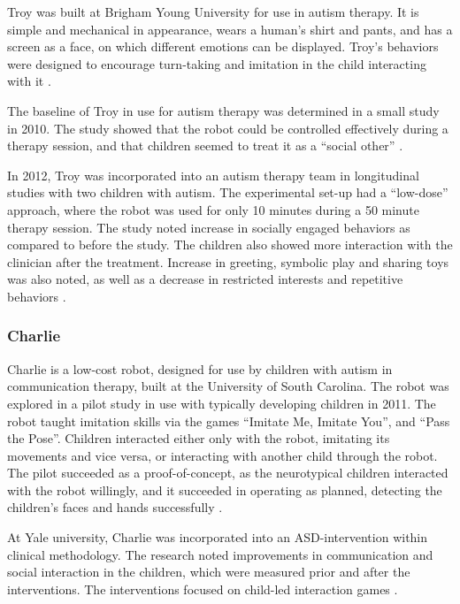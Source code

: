 Troy was built at Brigham Young University for use in autism therapy. It is simple and mechanical in appearance, wears a human's shirt and pants, and has a screen as a face, on which different emotions can be displayed. Troy's behaviors were designed to encourage turn-taking and imitation in the child interacting with it \cite{goodrich2011case}.

The baseline of Troy in use for autism therapy was determined in a small study in 2010. The study showed that the robot could be controlled effectively during a therapy session, and that children seemed to treat it as a ``social other'' \cite{giullian2010detailed}.

In 2012, Troy was incorporated into an autism therapy team in longitudinal studies with two children with autism. The experimental set-up had a ``low-dose'' approach, where the robot was used for only 10 minutes during a 50 minute therapy session. The study noted increase in socially engaged behaviors as compared to before the study. The children also showed more interaction with the clinician after the treatment. Increase in greeting, symbolic play and sharing toys was also noted, as well as a decrease in restricted interests and repetitive behaviors \cite{goodrich2012incorporating}.


\subsubsection{Charlie}

Charlie is a low-cost robot, designed for use by children with autism in communication therapy, built at the University of South Carolina. The robot was explored in a pilot study in use with typically developing children in 2011. The robot taught imitation skills via the games ``Imitate Me, Imitate You'', and ``Pass the Pose''. Children interacted either only with the robot, imitating its movements and vice versa, or interacting with another child through the robot. The pilot succeeded as a proof-of-concept, as the neurotypical children interacted with the robot willingly, and it succeeded in operating as planned, detecting the children's faces and hands successfully \cite{charlie2011}.

At Yale university, Charlie was incorporated into an ASD-intervention within clinical methodology. The research noted improvements in communication and social interaction in the children, which were measured prior and after the interventions. The interventions focused on child-led interaction games \cite{boccanfuso2017low}.


